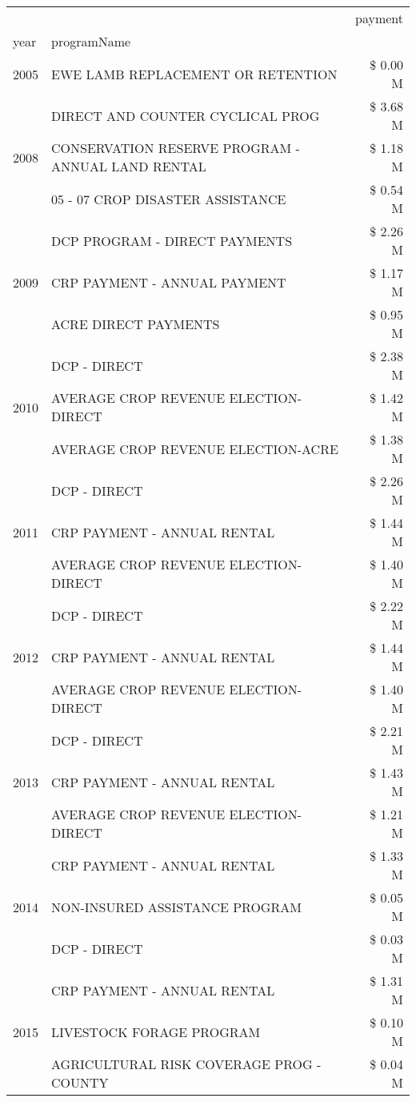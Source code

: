 \begin{tabular}{llr}
\toprule
 &  & payment \\
year & programName &  \\
\midrule
2005 & EWE LAMB REPLACEMENT OR RETENTION & \$ 0.00 M \\
\cline{1-3}
\multirow[t]{3}{*}{2008} & DIRECT AND COUNTER CYCLICAL PROG & \$ 3.68 M \\
 & CONSERVATION RESERVE PROGRAM - ANNUAL LAND RENTAL & \$ 1.18 M \\
 & 05 - 07 CROP DISASTER ASSISTANCE & \$ 0.54 M \\
\cline{1-3}
\multirow[t]{3}{*}{2009} & DCP PROGRAM - DIRECT PAYMENTS & \$ 2.26 M \\
 & CRP PAYMENT - ANNUAL PAYMENT & \$ 1.17 M \\
 & ACRE DIRECT PAYMENTS & \$ 0.95 M \\
\cline{1-3}
\multirow[t]{3}{*}{2010} & DCP - DIRECT & \$ 2.38 M \\
 & AVERAGE CROP REVENUE ELECTION-DIRECT & \$ 1.42 M \\
 & AVERAGE CROP REVENUE ELECTION-ACRE & \$ 1.38 M \\
\cline{1-3}
\multirow[t]{3}{*}{2011} & DCP - DIRECT & \$ 2.26 M \\
 & CRP PAYMENT - ANNUAL RENTAL & \$ 1.44 M \\
 & AVERAGE CROP REVENUE ELECTION-DIRECT & \$ 1.40 M \\
\cline{1-3}
\multirow[t]{3}{*}{2012} & DCP - DIRECT & \$ 2.22 M \\
 & CRP PAYMENT - ANNUAL RENTAL & \$ 1.44 M \\
 & AVERAGE CROP REVENUE ELECTION-DIRECT & \$ 1.40 M \\
\cline{1-3}
\multirow[t]{3}{*}{2013} & DCP - DIRECT & \$ 2.21 M \\
 & CRP PAYMENT - ANNUAL RENTAL & \$ 1.43 M \\
 & AVERAGE CROP REVENUE ELECTION-DIRECT & \$ 1.21 M \\
\cline{1-3}
\multirow[t]{3}{*}{2014} & CRP PAYMENT - ANNUAL RENTAL & \$ 1.33 M \\
 & NON-INSURED ASSISTANCE PROGRAM & \$ 0.05 M \\
 & DCP - DIRECT & \$ 0.03 M \\
\cline{1-3}
\multirow[t]{3}{*}{2015} & CRP PAYMENT - ANNUAL RENTAL & \$ 1.31 M \\
 & LIVESTOCK FORAGE PROGRAM & \$ 0.10 M \\
 & AGRICULTURAL RISK COVERAGE PROG - COUNTY & \$ 0.04 M \\

\end{tabular}

